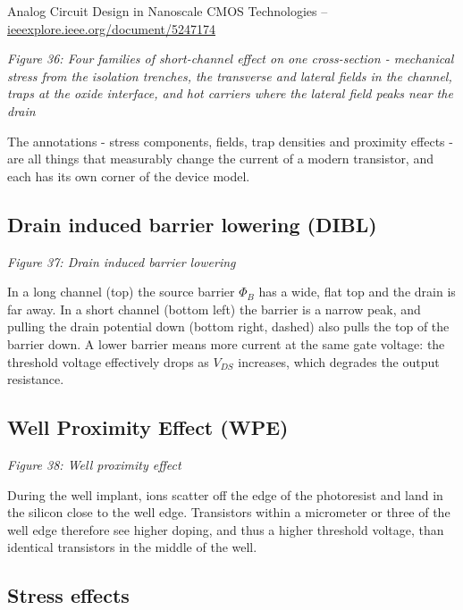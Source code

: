 Analog Circuit Design in Nanoscale CMOS Technologies
 --
\href{https://ieeexplore.ieee.org/document/5247174}{ieeexplore.ieee.org/document/5247174}


{
\centering
{}
}

\emph{Figure 36: Four families of short-channel effect on one
cross-section - mechanical stress from the isolation trenches, the
transverse and lateral fields in the channel, traps at the oxide
interface, and hot carriers where the lateral field peaks near the
drain}

The annotations - stress components, fields, trap densities and
proximity effects - are all things that measurably change the current of
a modern transistor, and each has its own corner of the device model.

\subsection{Drain induced barrier lowering
(DIBL)}\label{drain-induced-barrier-lowering-dibl}


{
\centering
{}
}

\emph{Figure 37: Drain induced barrier lowering}

In a long channel (top) the source barrier \(\Phi_B\) has a wide, flat
top and the drain is far away. In a short channel (bottom left) the
barrier is a narrow peak, and pulling the drain potential down (bottom
right, dashed) also pulls the top of the barrier down. A lower barrier
means more current at the same gate voltage: the threshold voltage
effectively drops as \(V_{DS}\) increases, which degrades the output
resistance.

\subsection{Well Proximity Effect
(WPE)}\label{well-proximity-effect-wpe}


{
\centering
{}
}

\emph{Figure 38: Well proximity effect}

During the well implant, ions scatter off the edge of the photoresist
and land in the silicon close to the well edge. Transistors within a
micrometer or three of the well edge therefore see higher doping, and
thus a higher threshold voltage, than identical transistors in the
middle of the well.

\subsection{Stress effects}\label{stress-effects}

